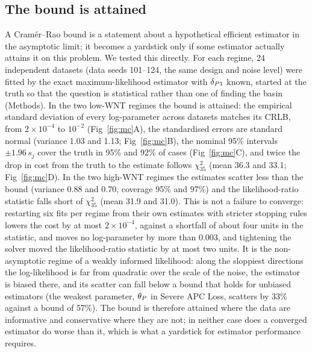 \subsection{The bound is attained}
\label{sec:res-mc}

A Cram\'er--Rao bound is a statement about a hypothetical efficient estimator
in the asymptotic limit; it becomes a yardstick only if some estimator actually
attains it on this problem. We tested this directly. For each regime, 24
independent datasets (data seeds 101--124, the same design and noise level)
were fitted by the exact maximum-likelihood estimator with $\delta_{P1}$ known, started
at the truth so that the question is statistical rather than one of finding the
basin (Methods). In the two low-WNT regimes the bound is attained: the
empirical standard deviation of every log-parameter across datasets matches
its CRLB, from $2\times10^{-4}$ to $10^{-2}$ (Fig~\ref{fig:mc}A), the standardised
errors are standard normal (variance 1.03 and 1.13; Fig~\ref{fig:mc}B), the
nominal 95\% intervals $\pm1.96\,s_j$ cover the truth in 95\% and 92\% of cases
(Fig~\ref{fig:mc}C), and twice the drop in cost from the truth to the estimate
follows $\chi^2_{35}$ (mean 36.3 and 33.1; Fig~\ref{fig:mc}D). In the two high-WNT
regimes the estimates scatter less than the bound (variance 0.88 and 0.70,
coverage 95\% and 97\%) and the likelihood-ratio statistic falls short of
$\chi^2_{35}$ (mean 31.9 and 31.0). This is not a failure to converge: restarting
six fits per regime from their own estimates with stricter stopping rules lowers
the cost by at most $2\times10^{-4}$, against a shortfall of about four units in
the statistic, and moves no log-parameter by more than 0.003, and tightening the solver moved the likelihood-ratio statistic by
at most two units. It is the non-asymptotic regime of a weakly informed
likelihood: along the sloppiest directions the log-likelihood is far from
quadratic over the scale of the noise, the estimator is biased there, and its
scatter can fall below a bound that holds for unbiased estimators (the weakest
parameter, $\theta_P$ in Severe APC Loss, scatters by 33\% against a bound of
57\%). The bound is therefore
attained where the data are informative and conservative where they are not;
in neither case does a converged estimator do worse than it, which is what a
yardstick for estimator performance requires.

